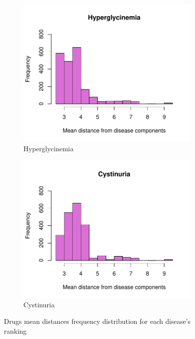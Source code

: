 \begin{figure}[h!]
\begin{subfigure}[b]{0.3\textwidth}
         \includegraphics[scale=0.25]{Images/Hyperglycinemia.pdf}
         \caption{Hyperglycinemia}
         \label{fig:Hyperglycinemia}
     \end{subfigure}
     \hfill
     \begin{subfigure}[b]{0.3\textwidth}
         \centering
         \includegraphics[scale=0.25]{Images/Cystinuria.pdf}
         \caption{Cystinuria}
         \label{fig:Cystinuria}
     \end{subfigure}
     \hfill
    \caption{Drugs mean distances frequency distribution for each disease's ranking}
    \label{fig:results}
\end{figure}
\FloatBarrier